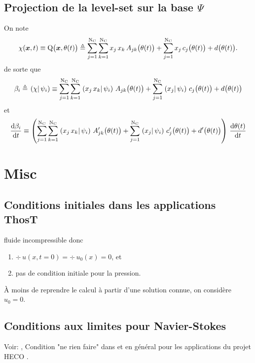 \documentclass[10pt,a4paper]{article}
\begin{document}
\subsection{Projection de la level-set sur la base $\Psi$}
%
On note 
$$\chi(\boldsymbol{x} ,t ) \equiv \mathrm{Q}\big(\boldsymbol{x}, \theta(t)\big) \triangleq \sum_{j=1}^{\mathrm{N_{C}}}\sum_{k=1}^{\mathrm{N_{C}}} x_j\, x_k\,A_{jk}\big(\theta(t)\big) + 
\sum_{j=1}^{\mathrm{N_{C}}} x_j\,c_{j}\big(\theta(t)\big) + d\big(\theta(t)\big).
 $$
de sorte que 
\begin{equation}
\beta_i \triangleq \left.\left(\chi\right\vert \psi_i\right) \equiv 
\sum_{j=1}^{\mathrm{N_{C}}}\sum_{k=1}^{\mathrm{N_{C}}} \left.\left(x_j\, x_k\right\vert \psi_i\right)\,A_{jk}\big(\theta(t)\big) + 
\sum_{j=1}^{\mathrm{N_{C}}} \left.\left(x_j\right\vert \psi_i\right)\,c_{j}\big(\theta(t)\big) + d\big(\theta(t)\big)
\end{equation}
et
\begin{equation}
\frac{\mathrm{d} \beta_i}{\mathrm{d} t}\equiv \left( 
\sum_{j=1}^{\mathrm{N_{C}}}\sum_{k=1}^{\mathrm{N_{C}}} \left.\left(x_j\, x_k\right\vert \psi_i\right)\,A^\prime_{jk}\big(\theta(t)\big) + 
\sum_{j=1}^{\mathrm{N_{C}}} \left.\left(x_j\right\vert \psi_i\right)\,c_{j}^\prime\big(\theta(t)\big) + d^\prime\big(\theta(t)\big) \right) \, \frac{\mathrm{d} \theta(t)}{\mathrm{d} t}
\end{equation}

%
\appendix
%
\newpage
%
\section{Misc}
\subsection{Conditions initiales dans les applications ThosT}
%
fluide incompressible donc
\begin{enumerate}
\item $\div \, u(x, t=0) = \div \, u_0(x) = 0$, et 
\item pas de condition initiale pour la pression.
\end{enumerate}
%
À moins de reprendre le calcul à partir d'une solution connue, on considère $u_0=0$.
% 
\subsection{Conditions aux limites pour Navier-Stokes}
%
Voir: \cite[p. 40-41]{segal2015finite}, Condition "ne rien faire" dans \cite{van1987numerical} et en général pour les applications du projet HECO \cite[p. 87]{hachem2009stabilized}.
%
\end{document}
